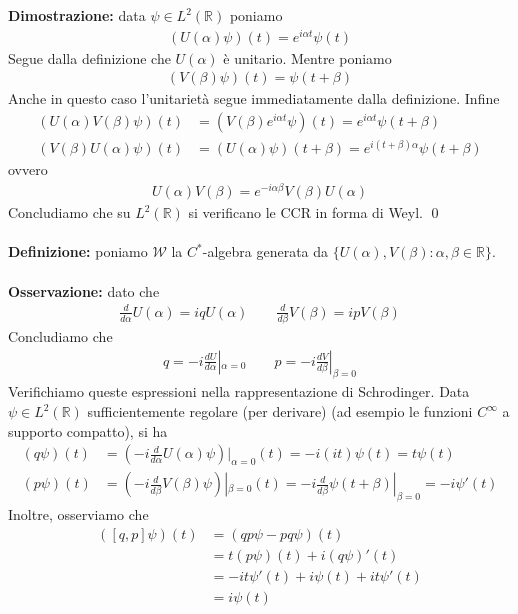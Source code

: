\documentclass{article}
\numberwithin{equation}{subsection}
\begin{document}
\textbf{Dimostrazione:} data $\psi \in L^2(\mathbb{R})$ poniamo
\begin{align*}
    (U(\alpha) \psi)(t) = e^{i\alpha t}\psi(t)
\end{align*}
Segue dalla definizione che $U(\alpha)$ è unitario. Mentre poniamo
\begin{align*}
    (V(\beta)\psi)(t) = \psi(t + \beta)
\end{align*}
Anche in questo caso l'unitarietà segue immediatamente dalla definizione. Infine
\begin{align*}
    (U(\alpha)V(\beta)\psi)(t) &= (V(\beta)e^{i\alpha t}\psi)(t) = e^{i\alpha t}\psi(t + \beta) \\
    (V(\beta)U(\alpha)\psi)(t) &= (U(\alpha)\psi)(t + \beta) = e^{i(t + \beta)\alpha}\psi(t + \beta)
\end{align*}
ovvero
\begin{align*}
    U(\alpha)V(\beta) = e^{-i\alpha\beta}V(\beta)U(\alpha)
\end{align*}
Concludiamo che su $L^2(\mathbb{R})$ si verificano le CCR in forma di Weyl. \qed \\ \\
\textbf{Definizione:} poniamo $\mathscr{W}$ la $C^*$-algebra generata da $\{U(\alpha), V(\beta) : \alpha, \beta \in \mathbb{R}\}$. \\ \\
\textbf{Osservazione:} dato che
\begin{align*}
    \frac{d}{d\alpha}U(\alpha) = iqU(\alpha) \qquad \frac{d}{d\beta}V(\beta) = ipV(\beta)
\end{align*}
Concludiamo che
\begin{align*}
    q = -i\frac{dU}{d\alpha}|_{\alpha = 0} \qquad p = -i\frac{dV}{d\beta}|_{\beta = 0}
\end{align*}
Verifichiamo queste espressioni nella rappresentazione di Schrodinger. Data $\psi \in L^2(\mathbb{R})$ sufficientemente regolare (per derivare) (ad esempio le funzioni $C^\infty$ a supporto compatto), si ha
\begin{align*}
    (q\psi)(t) &= \left(-i\frac{d}{d\alpha}U(\alpha)\psi\right)|_{\alpha = 0}(t) = -i(it)\psi(t) = t\psi(t) \\
    (p\psi)(t) &= \left(-i\frac{d}{d\beta}V(\beta)\psi\right)|_{\beta = 0}(t) = -i\frac{d}{d\beta}\psi(t + \beta)|_{\beta = 0} = -i\psi'(t)
\end{align*}
Inoltre, osserviamo che
\begin{align*}
    ([q, p]\psi)(t) &= (qp\psi - pq\psi)(t) \\
    &= t(p\psi)(t) + i(q\psi)'(t) \\
    &= -it\psi'(t) + i\psi(t) + it\psi'(t) \\
    &= i\psi(t)
\end{align*}
\end{document}
